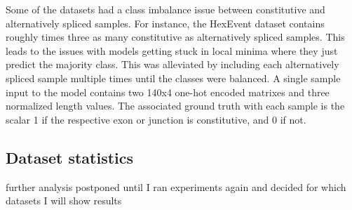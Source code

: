 Some of the datasets had a class imbalance issue between constitutive and alternatively spliced samples. For instance, the HexEvent dataset contains roughly times three as many constitutive as alternatively spliced samples. This leads to the issues with models getting stuck in local minima where they just predict the majority class. This was alleviated by including each alternatively spliced sample multiple times until the classes were balanced.
A single sample input to the model contains two 140x4 one-hot encoded matrixes and three normalized length values. The associated ground truth with each sample is the scalar 1 if the respective exon or junction is constitutive, and 0 if not.
\subsection{Dataset statistics} \cite{subsec:datasetstatistics}

further analysis postponed until I ran experiments again and decided for which datasets I will show results 

